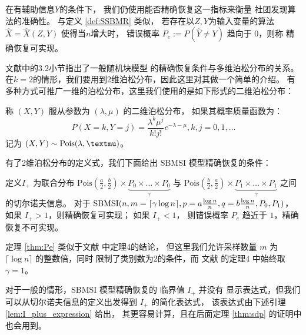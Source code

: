  在有辅助信息$Y$的条件下，
 我们仍使用能否精确恢复这一指标来衡量
 社团发现算法的准确性。
 与定义 \ref{def:SSBMR} 类似，
 若存在以$Z,Y$为输入变量的算法 $\hat{X}=\hat{X}(Z,Y)$
 使得当$n$增大时，
 错误概率
 $P_e:=P(\hat{Y} \neq Y)$ 趋向于 $0$，则称
 精确恢复可实现。

 文献中的3.2小节指出了一般随机块模型
 的精确恢复条件与多维泊松分布的关系。
在$k=2$的情形，我们要用到2维泊松分布，因此这里对其做一个简单的介绍。
有多种方式可推广一维的泊松分布，这里我们使用的是如下形式的二维泊松分布：

\begin{definition}
    称 $(X,Y)$ 服从参数为 $(\lambda, \mu)$ 的二维泊松分布，
    如果其概率质量函数为：
    \begin{equation}
        P(X=k, Y=j) = \frac{\lambda^k \mu^j}{k! j!}
        e^{-\lambda - \mu}, k,j=0,1,\dots
    \end{equation}
    记为 $(X,Y) \sim \Pois(\lambda, \mu)$。
\end{definition}

有了2维泊松分布的定义式，我们下面给出
SBMSI 模型精确恢复的条件：
\begin{theorem}\label{thm:Pe}
    定义$I_+$ 为联合分布 $\textrm{Pois}(\frac{a}{2},\frac{b}{2})\times \underbrace{P_0 \times \dots \times P_0}_{\gamma}$
    与 $\textrm{Pois}(\frac{b}{2}, \frac{a}{2})\times \underbrace{P_1 \times \dots \times P_1}_{\gamma}$ 
    之间的切尔诺夫信息。    
    对于 $\operatorname{SBMSI}(n,m=\lceil \gamma \log n \rceil, p=a\frac{\log n}{n},q=b\frac{\log n}{n},P_0,P_1)$，
    如果 $I_+>1$，则精确恢复可实现；
    如果 $I_+ < 1$，
    则错误概率 $P_e$ 趋近于 $1$，精确恢复不可实现。
\end{theorem}

定理 \ref{thm:Pe} 类似于文献  中定理4的结论，
但这里我们允许采样数量 $m$ 为
$\lceil \log n \rceil $ 的整数倍，同时
限制了类别数为2的条件，而 文献  的定理4
中始终取$\gamma=1$。

对于一般的情形，SBMSI 模型精确恢复的 临界值 $I_+$ 并没有
显示表达式，但我们可以从切尔诺夫信息的定义出发得到 $I_+$ 的简化表达式，
该表达式由下述引理 \ref{lem:I_plus_expression} 给出，
其更容易计算，且在后面定理 \ref{thm:sdp} 的证明中也会用到。

